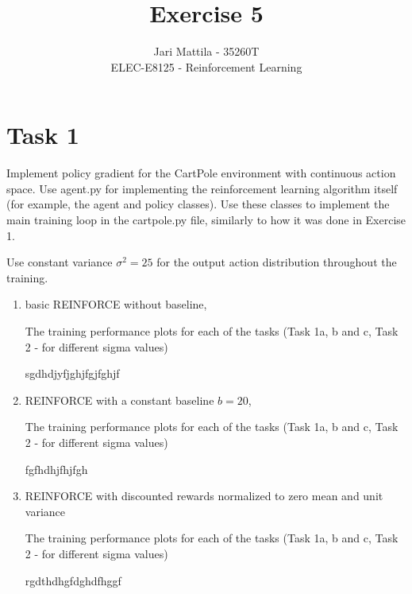 \documentclass[12pt]{article}
\begin{document}
 
\title{Exercise 5}
\author{Jari Mattila - 35260T\\
ELEC-E8125 - Reinforcement Learning}

\maketitle

\section{Task 1}

Implement policy gradient for the CartPole environment with continuous
action space. Use agent.py for implementing the reinforcement learning algorithm itself (for
example, the agent and policy classes). Use these classes to implement the main training loop
in the cartpole.py file, similarly to how it was done in Exercise 1.
\newline

Use constant variance $\sigma^2 = 25$ for the output action distribution throughout the training.

\begin{enumerate}[label=(\alph*)]
    \item basic REINFORCE without baseline, 
   
The training performance plots for each of the tasks (Task 1a, b and c, Task 2 - for
different sigma values)
\newline

sgdhdjyfjghjfgjfghjf

    \item REINFORCE with a constant baseline $b = 20$,

The training performance plots for each of the tasks (Task 1a, b and c, Task 2 - for
different sigma values)
\newline

fgfhdhjfhjfgh
    
    \item REINFORCE with discounted rewards normalized to zero mean and unit variance

The training performance plots for each of the tasks (Task 1a, b and c, Task 2 - for
different sigma values)
\newline

rgdthdhgfdghdfhggf 

\end{enumerate}
\end{document}
